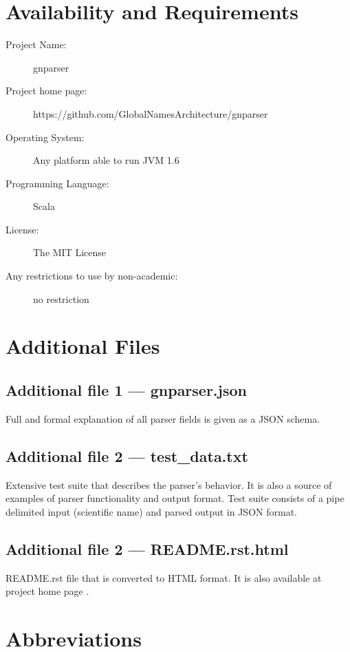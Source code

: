 \documentclass{bmcart}
\begin{document}
\section*{Availability and Requirements}

\begin{description}
  \item[Project Name:] gnparser
  \item[Project home page:] https://github.com/GlobalNamesArchitecture/gnparser
  \item[Operating System:] Any platform able to run JVM 1.6
  \item[Programming Language:] Scala
  \item[License:] The MIT License
  \item[Any restrictions to use by non-academic:] no restriction
\end{description}

\section*{Additional Files}

  \subsection*{Additional file 1 --- gnparser.json}
  Full and formal explanation of all parser fields is given as a JSON schema.
  
  \subsection*{Additional file 2 --- test\_data.txt}
  Extensive test suite that describes the parser's behavior. It is also a 
  source of examples of parser functionality and output format.
  Test suite consists of a pipe delimited input (scientific name) and parsed
  output in JSON format.

  \subsection*{Additional file 2 --- README.rst.html}
  README.rst file that is converted to HTML format. It is also available at 
  project home page \cite{gnparser}.  

\section*{Abbreviations}
\end{document}
